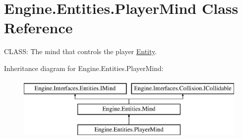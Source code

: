 \hypertarget{a00326}{}\section{Engine.\+Entities.\+Player\+Mind Class Reference}
\label{a00326}


C\+L\+A\+SS\+: The mind that controls the player \hyperlink{a00314}{Entity}.  


Inheritance diagram for Engine.\+Entities.\+Player\+Mind\+:\begin{figure}[H]
\begin{center}
\leavevmode
\includegraphics[height=3.000000cm]{d8/d23/a00326}
\end{center}
\end{figure}
